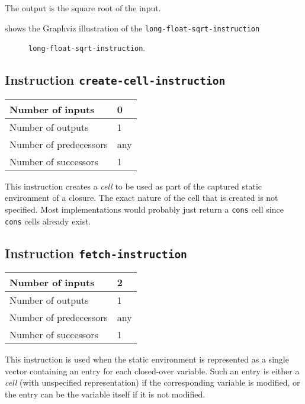 The output is the square root of the input.

 shows the Graphviz illustration of the
\texttt{long-float-sqrt-instruction}

\begin{figure}
\begin{center}
\end{center}
\caption{\label{fig-long-float-sqrt-instruction}
\texttt{long-float-sqrt-instruction}.}
\end{figure}

\subsection{Instruction \texttt{create-cell-instruction}}
\label{mir-instruction-create-cell}

\begin{tabular}{|l|l|}
\hline
Number of inputs & 0\\
\hline
Number of outputs & 1\\
\hline
Number of predecessors & any\\
\hline
Number of successors & 1\\
\hline
\end{tabular}

This instruction creates a \emph{cell} to be used as part of the
captured static environment of a closure.  The exact nature of the
cell that is created is not specified.  Most implementations would
probably just return a \texttt{cons} cell since \texttt{cons} cells
already exist.

\subsection{Instruction \texttt{fetch-instruction}}
\label{mir-instruction-fetch}

\begin{tabular}{|l|l|}
\hline
Number of inputs & 2\\
\hline
Number of outputs & 1\\
\hline
Number of predecessors & any\\
\hline
Number of successors & 1\\
\hline
\end{tabular}

This instruction is used when the static environment is represented as
a single vector containing an entry for each closed-over variable.
Such an entry is either a \emph{cell} (with unspecified
representation) if the corresponding variable is modified, or the
entry can be the variable itself if it is not modified.

